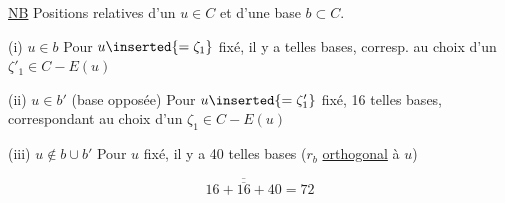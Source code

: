 \uline{NB} Positions relatives  d'un $u\in C$ et d'une base $b\subset C$.

(i) $u\in b$ \quad Pour $u\inserted{=\zeta_1}$ fixé, il y a  telles bases, corresp.  au choix d'un $\zeta'_1\in C-E(u)$

 (ii) $u\in b'$ (base opposée) Pour $u\inserted{=\zeta'_1}$ fixé, 16 telles bases, correspondant au choix d'un $\zeta_1\in C-E(u)$

(iii) $u\notin b\cup b'$ \quad Pour $u$ fixé, il y a 40 telles bases ($r_b$ \uline{orthogonal} à $u$)

\[
\overline{\overline{16+16+40}}=72
\]
